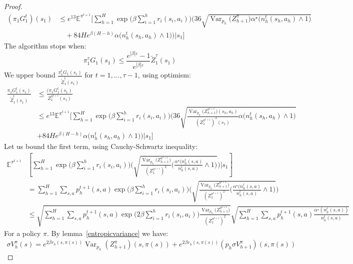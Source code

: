 \documentclass[final,12pt]{colt2026} %
\begin{document}
\begin{proof}
\begin{align*}
(\pi_1 G_1^t)(s_1)
&\leq e^{13}
\mathbb{E}^{\pi^{t+1}}\Bigg[
\sum_{h=1}^{H}
\exp\Big(\beta\sum_{i=1}^{h} r_i(s_i,a_i)\Big)
\Bigg(
36\sqrt{\operatorname{Var}_{p_h}\big(Z_{h+1}^{\pi}\big)\alpha^\star\big(n_h^t(s_h,a_h) \wedge 1\big)}
\\ 
&\quad+
84 H e^{\beta(H-h)}\alpha\big(n_h^t(s_h,a_h) \wedge 1\big)
\Bigg)
\Bigg| s_1
\Bigg]
\end{align*}
The algorithm stops when:
$$\pi_1^\tau G_1(s_1) \leq \frac{e^{|\beta| \varepsilon} - 1}{e^{|\beta| \varepsilon}} \widetilde{Z}^\tau_1(s_1) $$
We upper bound $\frac{\pi_1^t G_1(s_1)}{\widetilde{Z}^t_1(s_1)}$ for $t=1,...,\tau-1$, using optimism: 
\begin{align*}
\frac{\pi_1 G_1^t(s_1)}{\widetilde{Z}_1^t(s_1)}
&\leq \frac{(\pi_1 G_1^t(s_1)}{ Z_1^{\pi^{t+1}}(s_1)} \\ &\leq e^{13}
\mathbb{E}^{\pi^{t+1}}\Bigg[
\sum_{h=1}^{H} 
\exp\Big(\beta\sum_{i=1}^{h} r_i(s_i,a_i)\Big)
\Bigg(
36\sqrt{\frac{\operatorname{Var}_{p_h}\big(Z_{h+1}^{\pi^{t+1}}\big)(s_h,a_h)}{(Z_1^{\pi^{t+1}})^2(s_1)}\alpha\big(n_h^t(s_h,a_h) \wedge 1\big)}
\\&+
84He^{\beta(H-h)}\alpha\big(n_h^t(s_h,a_h) \wedge 1\big)
\Bigg)
\Bigg| s_1
\Bigg]
\end{align*}
Let us bound the first term, using Cauchy-Schwartz inequality:
\begin{align*}
\mathbb{E}^{\pi^{t+1}} & \left[\sum_{h=1}^{H}  
\exp\Big(\beta \sum_{i=1}^{h} r_i(s_i,a_i)\Big)
\Bigg(
\sqrt{\frac{\operatorname{Var}_{p_h}\big(Z_{h+1}^{\pi^{t+1}}\big)}{(Z_1^{\pi^{t+1}})^2}\big(\frac{\alpha^\star\big(n_h^t(s,a)}{n_h^t(s,a)} \wedge 1 \big)}\Big) \Bigg| s_1\right] \\ &=  \sum_{h=1}^H \sum_{s,a} p_h^{t+1}(s,a) \exp\Big(\beta \sum_{i=1}^{h} r_i(s_i,a_i)\Big)
\Bigg(
\sqrt{\frac{\operatorname{Var}_{p_h}\big(Z_{h+1}^{\pi^{t+1}}\big)}{(Z_1^{\pi^{t+1}})^2}\big(\frac{\alpha^\star\big(n_h^t(s,a)}{n_h^t(s,a)} \wedge 1 \big)}\Big) \\
&\leq \sqrt{\sum_{h=1}^H \sum_{s,a}p_h^{t+1}(s,a) \exp\Big(2\beta \sum_{i=1}^{h} r_i(s_i,a_i)\Big) \frac{\operatorname{Var}_{p_h}\big(Z_{h+1}^{\pi^{t+1}}\big)}{(Z_1^{\pi^{t+1}})^2}} \sqrt{\sum_{h=1}^H \sum_{s,a}p_h^{t+1}(s,a) \frac{\alpha^\star(n_h^t(s,a))}{n_h^t(s,a)}}
\end{align*}
For a policy $\pi$. By lemma~\ref{entropicvariance} we have:
\begin{align*}
    \sigma V_h^{\pi}(s) = e^{2\beta r_h(s, \pi(s))} \operatorname{Var}_{p_h}\left(Z_{h+1}^{\pi}\right)(s, \pi(s)) + e^{2\beta r_h(s, \pi(s))} \left(p_h \sigma V_{h+1}^{\pi}\right)(s, \pi(s))

\end{align*}
\end{proof}
\end{document}
